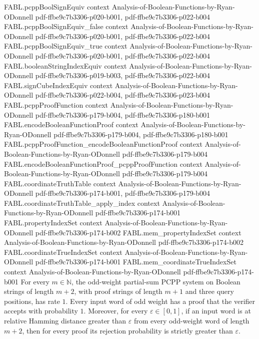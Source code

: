 \begin{theorem}
\proofstep
  {FABL.pcppBoolSignEquiv}
  {context}
  {Analysis-of-Boolean-Functions-by-Ryan-ODonnell}
  {pdf-ffbe9c7b3306-p020-b001,
    pdf-ffbe9c7b3306-p022-b004}
\proofstep
  {FABL.pcppBoolSignEquiv_false}
  {context}
  {Analysis-of-Boolean-Functions-by-Ryan-ODonnell}
  {pdf-ffbe9c7b3306-p020-b001,
    pdf-ffbe9c7b3306-p022-b004}
\proofstep
  {FABL.pcppBoolSignEquiv_true}
  {context}
  {Analysis-of-Boolean-Functions-by-Ryan-ODonnell}
  {pdf-ffbe9c7b3306-p020-b001,
    pdf-ffbe9c7b3306-p022-b004}
\proofstep
  {FABL.booleanStringIndexEquiv}
  {context}
  {Analysis-of-Boolean-Functions-by-Ryan-ODonnell}
  {pdf-ffbe9c7b3306-p019-b003,
    pdf-ffbe9c7b3306-p022-b004}
\proofstep
  {FABL.signCubeIndexEquiv}
  {context}
  {Analysis-of-Boolean-Functions-by-Ryan-ODonnell}
  {pdf-ffbe9c7b3306-p022-b004,
    pdf-ffbe9c7b3306-p023-b004}
\proofstep
  {FABL.pcppProofFunction}
  {context}
  {Analysis-of-Boolean-Functions-by-Ryan-ODonnell}
  {pdf-ffbe9c7b3306-p179-b004,
    pdf-ffbe9c7b3306-p180-b001}
\proofstep
  {FABL.encodeBooleanFunctionProof}
  {context}
  {Analysis-of-Boolean-Functions-by-Ryan-ODonnell}
  {pdf-ffbe9c7b3306-p179-b004,
    pdf-ffbe9c7b3306-p180-b001}
\proofstep
  {FABL.pcppProofFunction_encodeBooleanFunctionProof}
  {context}
  {Analysis-of-Boolean-Functions-by-Ryan-ODonnell}
  {pdf-ffbe9c7b3306-p179-b004}
\proofstep
  {FABL.encodeBooleanFunctionProof_pcppProofFunction}
  {context}
  {Analysis-of-Boolean-Functions-by-Ryan-ODonnell}
  {pdf-ffbe9c7b3306-p179-b004}
\proofstep
  {FABL.coordinateTruthTable}
  {context}
  {Analysis-of-Boolean-Functions-by-Ryan-ODonnell}
  {pdf-ffbe9c7b3306-p174-b001,
    pdf-ffbe9c7b3306-p179-b004}
\proofstep
  {FABL.coordinateTruthTable_apply_index}
  {context}
  {Analysis-of-Boolean-Functions-by-Ryan-ODonnell}
  {pdf-ffbe9c7b3306-p174-b001}
\proofstep
  {FABL.propertyIndexSet}
  {context}
  {Analysis-of-Boolean-Functions-by-Ryan-ODonnell}
  {pdf-ffbe9c7b3306-p174-b002}
\proofstep
  {FABL.mem_propertyIndexSet}
  {context}
  {Analysis-of-Boolean-Functions-by-Ryan-ODonnell}
  {pdf-ffbe9c7b3306-p174-b002}
\proofstep
  {FABL.coordinateTrueIndexSet}
  {context}
  {Analysis-of-Boolean-Functions-by-Ryan-ODonnell}
  {pdf-ffbe9c7b3306-p174-b001}
\proofstep
  {FABL.mem_coordinateTrueIndexSet}
  {context}
  {Analysis-of-Boolean-Functions-by-Ryan-ODonnell}
  {pdf-ffbe9c7b3306-p174-b001}
For every $m\in\mathbb{N}$, the odd-weight partial-sum PCPP system on Boolean strings of
length $m+2$, with proof strings of length $m+1$ and three query positions, has rate
$1$. Every input word of odd weight has a proof that the verifier accepts with
probability $1$. Moreover, for every $\varepsilon\in[0,1]$, if an input word is at
relative Hamming distance greater than $\varepsilon$ from every odd-weight word of
length $m+2$, then for every proof its rejection probability is strictly greater than
$\varepsilon$.
\end{theorem}

